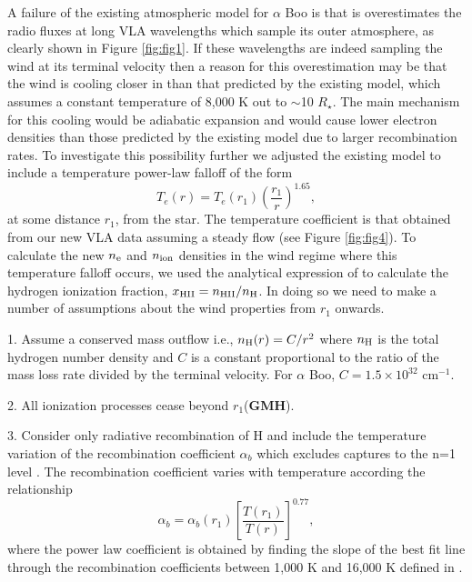 \documentclass[iop]{emulateapj}
\begin{document}
A failure of the existing atmospheric model for $\alpha$ Boo is that is overestimates the radio fluxes at long VLA wavelengths which sample its outer atmosphere, as clearly shown in Figure \ref{fig:fig1}. If these wavelengths are indeed sampling the wind at its terminal velocity then a reason for this overestimation may be that the wind is cooling closer in than that predicted by the existing model, which assumes a constant temperature of 8,000 K out to $\sim$10 $R_{\star}$. The main mechanism for this cooling would be adiabatic expansion \citep{2011ASPC..448..691O} and would cause lower electron densities than those predicted by the existing model due to larger recombination rates. To investigate this possibility further we adjusted the existing model to include a temperature power-law falloff of the form
\begin{equation}
T_{e}(r)= T_{e}(r_{1})\left(\frac{r_{1}}{r}\right)^{1.65},
\label{eq:eq2}
\end{equation}
at some distance $r_{1}$, from the star. The temperature coefficient is that obtained from our new VLA data assuming a steady flow (see Figure \ref{fig:fig4}). To calculate the new $n_{\rm{e}}$ and $n_{\rm{ion}}$ densities in the wind regime where this temperature falloff occurs, we used the analytical expression of \cite{1986ApJ...306..605G} to calculate the hydrogen ionization fraction, $x_{\rm{HII}}=n_{\rm{HII}}/n_{\rm{H}}$. In doing so we need to make a number of assumptions about the wind properties from $r_{1}$ onwards.
\item 1. Assume a conserved mass outflow i.e., $n_{\rm{H}}(r)=C/r^2$ where $n_{\rm{H}}$ is the total hydrogen number density and $C$ is a constant proportional to the ratio of the mass loss rate divided by the terminal velocity. For $\alpha$ Boo, $C = 1.5 \times 10^{32} $ cm$^{-1}$.
\item 2. All ionization processes cease beyond $r_{1}$(\textbf{GMH}).
\item 3. Consider only radiative recombination of H and include the temperature variation of the recombination coefficient $\alpha _{b}$ which excludes captures to the n=1 level \citep{1978ppim.book.....S}. The recombination coefficient varies with temperature according the relationship
\begin{equation}
\alpha _{b} = \alpha _{b}(r_{1})\left[\frac{T(r_1)}{T(r)}\right]^{0.77},
\label{eq:eq3}
\end{equation}
where the power law coefficient is obtained by finding the slope of the best fit line through the recombination coefficients between 1,000 K and 16,000 K defined in \cite{1978ppim.book.....S}.
\end{document}

